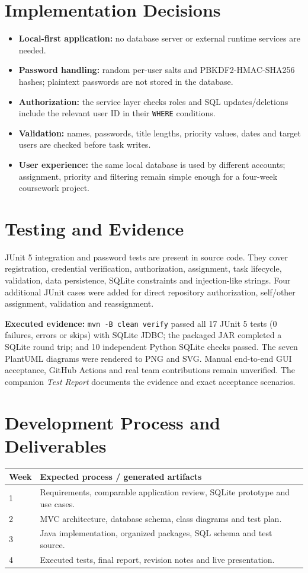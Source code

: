 \documentclass[11pt,a4paper]{article}
\begin{document}
\section{Implementation Decisions}
\begin{itemize}
\item \textbf{Local-first application:} no database server or external runtime services are needed.
\item \textbf{Password handling:} random per-user salts and PBKDF2-HMAC-SHA256 hashes; plaintext passwords are not stored in the database.
\item \textbf{Authorization:} the service layer checks roles and SQL updates/deletions include the relevant user ID in their \texttt{WHERE} conditions.
\item \textbf{Validation:} names, passwords, title lengths, priority values, dates and target users are checked before task writes.
\item \textbf{User experience:} the same local database is used by different accounts; assignment, priority and filtering remain simple enough for a four-week coursework project.
\end{itemize}

\section{Testing and Evidence}
JUnit 5 integration and password tests are present in source code. They cover registration, credential verification, authorization, assignment, task lifecycle, validation, data persistence, SQLite constraints and injection-like strings. Four additional JUnit cases were added for direct repository authorization, self/other assignment, validation and reassignment.

\textbf{Executed evidence:} \texttt{mvn -B clean verify} passed all 17 JUnit 5 tests (0 failures, errors or skips) with SQLite JDBC; the packaged JAR completed a SQLite round trip; and 10 independent Python SQLite checks passed. The seven PlantUML diagrams were rendered to PNG and SVG. Manual end-to-end GUI acceptance, GitHub Actions and real team contributions remain unverified. The companion \textit{Test Report} documents the evidence and exact acceptance scenarios.

\section{Development Process and Deliverables}
\begin{tabularx}{\linewidth}{p{20mm}X}
\toprule Week & Expected process / generated artifacts \\ \midrule
1 & Requirements, comparable application review, SQLite prototype and use cases.\\
2 & MVC architecture, database schema, class diagrams and test plan.\\
3 & Java implementation, organized packages, SQL schema and test source.\\
4 & Executed tests, final report, revision notes and live presentation.\\
\bottomrule
\end{tabularx}
\end{document}
